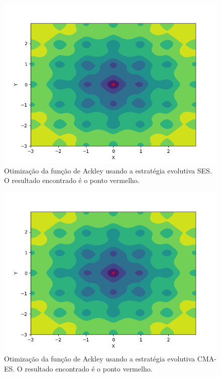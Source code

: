 \documentclass[conference]{IEEEtran}
\begin{document}
\begin{figure}[htbp]
\centering
\centerline{\includegraphics[scale=0.6]{imagens/ackley/ses.png}}
\caption{Otimização da função de Ackley usando a estratégia evolutiva SES. O resultado encontrado é o ponto vermelho.}
\label{ackley/ses}
\end{figure} 

\begin{figure}[htbp]
\centering
\centerline{\includegraphics[scale=0.6]{imagens/ackley/cmaes.png}}
\caption{Otimização da função de Ackley usando a estratégia evolutiva CMA-ES. O resultado encontrado é o ponto vermelho.}
\label{ackley/cmaes}
\end{figure}
\end{document}
